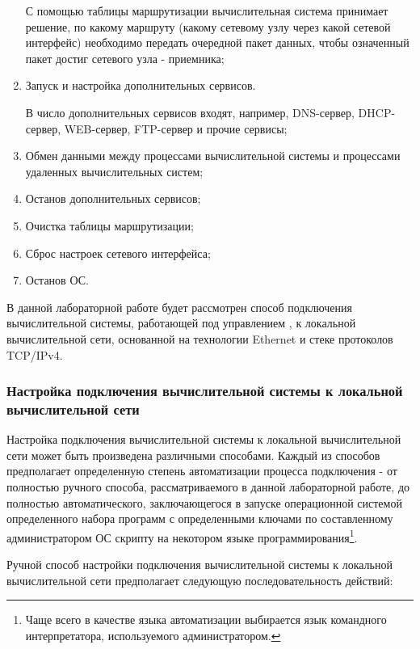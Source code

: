 \begin{enumerate}
		С помощью таблицы маршрутизации вычислительная система принимает решение, по какому маршруту
		(какому сетевому узлу через какой сетевой интерфейс) необходимо передать очередной пакет данных, чтобы
		означенный пакет достиг сетевого узла - приемника;

		\item Запуск и настройка дополнительных сервисов.

		В число дополнительных сервисов входят, например, DNS-сервер, DHCP-сервер, WEB-сервер, FTP-сервер и прочие сервисы;

		\item Обмен данными между процессами вычислительной системы и процессами удаленных вычислительных систем;

		\item Останов дополнительных сервисов;

		\item Очистка таблицы маршрутизации;

		\item Сброс настроек сетевого интерфейса;

		\item Останов ОС.

	\end{enumerate}

	В данной лабораторной работе будет рассмотрен способ подключения вычислительной системы, работающей
	под управлением \linux, к локальной вычислительной сети, основанной на технологии Ethernet и
	стеке протоколов TCP/IPv4.

\subsubsection{Настройка подключения вычислительной системы к локальной вычислительной сети}

	Настройка подключения вычислительной системы к локальной вычислительной сети может быть произведена
	различными способами. Каждый из способов предполагает определенную степень автоматизации процесса подключения -
	от полностью ручного способа, рассматриваемого в данной лабораторной работе, до полностью автоматического,
	заключающегося в запуске операционной системой определенного набора программ с определенными ключами по
	составленному администратором ОС скрипту на некотором языке программирования\footnote{Чаще всего в качестве языка автоматизации
	выбирается язык командного интерпретатора, используемого администратором.}.

	Ручной способ настройки подключения вычислительной системы к локальной вычислительной сети предполагает следующую последовательность
	действий:

